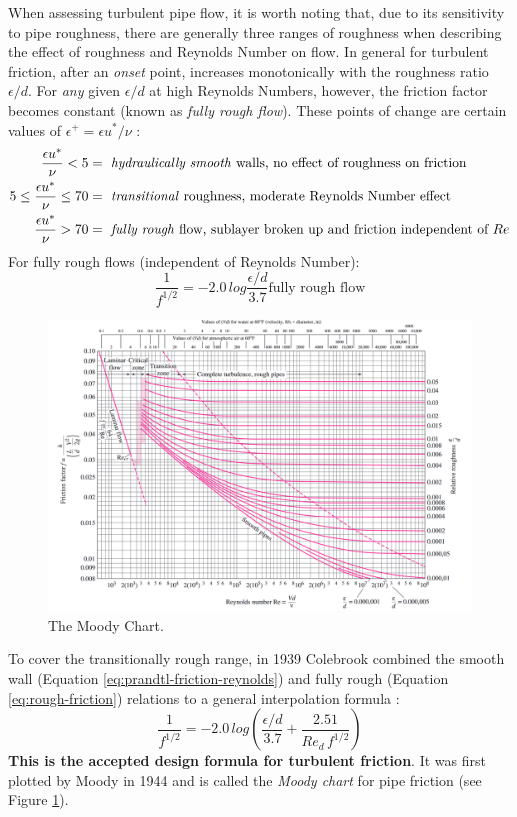 \documentclass[9pt]{article} %
\numberwithin{equation}{section} %
\begin{document}
\begin{multicols}{2}
When assessing turbulent pipe flow, it is worth noting that, due to its sensitivity to pipe roughness, there are generally three ranges of roughness when describing the effect of roughness and Reynolds Number on flow. In general for turbulent friction, after an \textit{onset} point, increases monotonically with the roughness ratio $\epsilon/d$. For \textit{any} given $\epsilon/d$ at high Reynolds Numbers, however, the friction factor becomes constant (known as \textit{fully rough flow}). These points of change are certain values of $\epsilon^{+} = \epsilon u^{*}/\nu$ \cite{fluid-mechanics}:
\begin{align*}
\frac{\epsilon u^{*}}{\nu} < 5 &= \text{ \textit{hydraulically smooth} walls, no effect of roughness on friction} \\
5 \leq \frac{\epsilon u^{*}}{\nu} \leq 70 &= \text{ \textit{transitional} roughness, moderate Reynolds Number effect} \\
\frac{\epsilon u^{*}}{\nu} > 70 &= \text{ \textit{fully rough} flow, sublayer broken up and friction independent of } Re
\end{align*}
For fully rough flows (independent of Reynolds Number):
\begin{equation} \label{eq:rough-friction}
\frac{1}{f^{1/2}} = -2.0\, log \frac{\epsilon/d}{3.7} \text{fully rough flow}
\end{equation}
\begin{figure}[!htb]
\centering
\includegraphics[scale=0.55]{moody_chart}
\caption{The Moody Chart.}
\label{fig:moody-chart}
\end{figure}
To cover the transitionally rough range, in 1939 Colebrook combined the smooth wall (Equation \ref{eq:prandtl-friction-reynolds}) and fully rough (Equation \ref{eq:rough-friction}) relations to a general interpolation formula \cite{fluid-mechanics}:
\begin{equation} \label{eq:moody}
\frac{1}{f^{1/2}} = -2.0\, log \left( \frac{\epsilon/d}{3.7} + \frac{2.51}{Re_{d}\, f^{1/2}} \right)
\end{equation}
\textbf{This is the accepted design formula for turbulent friction}. It was first plotted by Moody in 1944 and is called the \textit{Moody chart} for pipe friction (see Figure \ref{fig:moody-chart}).


\end{multicols}
\end{document}
